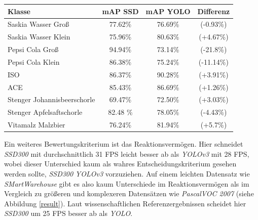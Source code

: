 \begin{center}
	\begin{tabular}[H]{l|c|c|c}
		Klasse & mAP SSD & mAP YOLO & Differenz \\
		\hline
		Saskia Wasser Groß & 77.62\%  & 76.69\% & (-0.93\%) \\
		Saskia Wasser Klein & 75.96\%  & 80.63\% & (+4.67\%) \\
		Pepsi Cola Groß & 94.94\% & 73.14\% & (-21.8\%) \\
		Pepsi Cola Klein & 86.38\% & 75.24\% & (-11.14\%) \\
		ISO & 86.37\% & 90.28\% & (+3.91\%) \\
		ACE & 85.43\% & 86.69\% & (+1.26\%) \\
		Stenger Johannisbeerschorle & 69.47\% & 72.50\% & (+3.03\%) \\
		Stenger Apfelsaftschorle & 82.48 \% & 78.05\% & (-4.43\%) \\
		Vitamalz Malzbier & 76.24\% & 81.94\% & (+5.7\%)
	\end{tabular}
	\label{table:rescomparison}
\end{center}

Ein weiteres Bewertungskriterium ist das Reaktionsvermögen. Hier schneidet \textit{SSD300} mit durchschnittlich 31 FPS leicht besser ab als \textit{YOLOv3} mit 28 FPS, wobei dieser Unterschied kaum als wahres Entscheidungskriterium gesehen werden sollte, \textit{SSD300} \textit{YOLOv3} vorzuziehen. Auf einem leichten Datensatz wie \textit{SMartWarehouse} gibt es also kaum Unterschiede im Reaktionsvermögen als im Vergleich zu größeren und komplexeren Datensätzen wie \textit{PascalVOC 2007} (siehe Abbildung \ref{result}). Laut wissenschaftlichen Referenzergebnissen scheidet hier \textit{SSD300} um 25 FPS besser ab als \textit{YOLO}.

